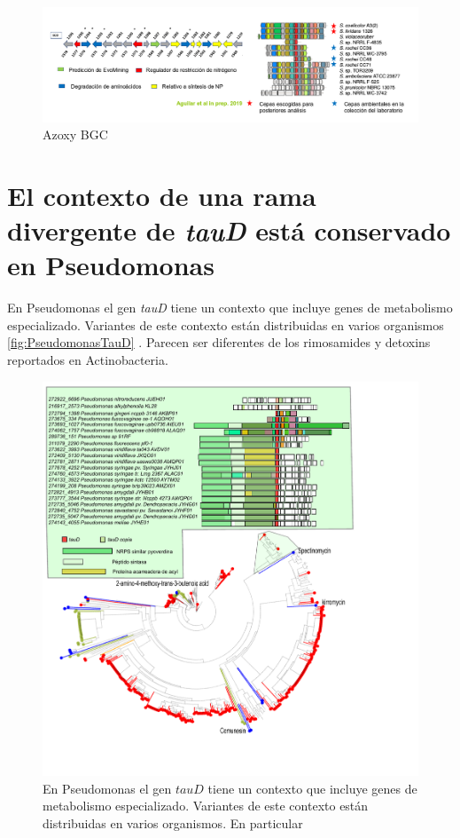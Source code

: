 \documentclass[12pt,twoside]{reedthesis}
\begin{document}
  \begin{figure}[h!tbp]
  \centering
  \includegraphics[angle = 0,scale = .4]{chapter3/azoxy.png}
  \caption[EvoMining Algorithm]{\footnotesize{Azoxy BGC}}
  \label{fig:azoxy}
  \end{figure}
  
  \clearpage
  
  \section{\texorpdfstring{El contexto de una rama divergente de
  \emph{tauD} está conservado en
  Pseudomonas}{El contexto de una rama divergente de tauD está conservado en Pseudomonas}}\label{el-contexto-de-una-rama-divergente-de-taud-esta-conservado-en-pseudomonas}
  
  En Pseudomonas el gen \emph{tauD} tiene un contexto que incluye genes de
  metabolismo especializado. Variantes de este contexto están distribuidas
  en varios organismos \autoref{fig:PseudomonasTauD} . Parecen ser
  diferentes de los rimosamides y detoxins reportados en Actinobacteria.
  
  \begin{figure}[h!tbp]
  \centering
  \includegraphics[angle = 0,scale = .9]{chapter3/PseudomonasTauD.pdf}
  \caption[EvoMining Algorithm]{\footnotesize{En Pseudomonas el gen $tauD$ tiene un contexto que incluye genes de metabolismo especializado. Variantes de este contexto están distribuidas en varios organismos. En particular  }}
  \label{fig:PseudomonasTauD}
  \end{figure}
  
\end{document}
